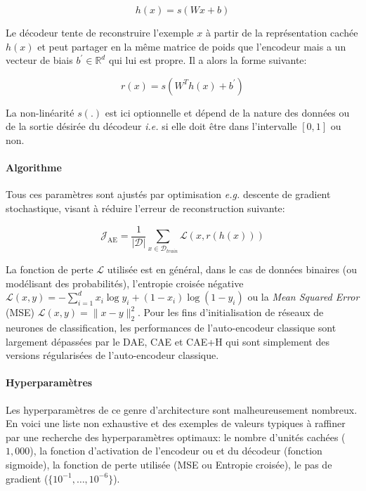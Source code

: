 \begin{equation}
h(x)=s(Wx+b)
\end{equation}

Le décodeur tente de reconstruire l'exemple $x$ à partir de la représentation
cachée $h(x)$ et peut partager en la m\^eme matrice de poids que l'encodeur
mais a un vecteur de biais $b^{'}\in\mathbb{R}^d$ qui lui est propre. Il a
alors la forme suivante:

\begin{equation}
r(x)=s(W^{T} h(x)+b^{'}) \label{eq:autoenc}
\end{equation} 

La non-linéarité $s(.)$ est ici optionnelle et dépend de la nature des données
ou de la sortie désirée du décodeur \textit{i.e.} si elle doit \^etre dans
l'intervalle $[0,1]$ ou non.  \\

\paragraph{Algorithme}
Tous ces paramètres sont ajustés par optimisation \textit{e.g.} descente de
gradient stochastique, visant à réduire l'erreur de reconstruction suivante:

\begin{equation}
\mathcal{J}_{\textrm{AE}} = \frac{1}{\vert \mathcal{D}\vert}\sum_{x\in\mathcal{D}_{train}}\mathcal{L}(x,r(h(x)))
\label{eq:ae}
\end{equation}

La fonction de perte $\mathcal{L}$ utilisée est en général, dans le cas de
données binaires (ou modélisant des probabilités), l'entropie croisée négative
$\mathcal{L}(x,y) = -\sum_{i=1}^d x_i\log y_i + (1-x_i)\log(1-y_i)$ ou la
\textit{Mean Squared Error} (MSE) $\mathcal{L}(x,y) = \| x-y\|^2_2$. Pour les
fins d'initialisation de réseaux de neurones de classification, les
performances de l'auto-encodeur classique sont largement dépassées par le DAE,
CAE et CAE+H qui sont simplement des versions régularisées de l'auto-encodeur
classique.

\paragraph{Hyperparamètres} Les hyperparamètres de ce genre d'architecture sont
malheureusement nombreux. En voici une liste non exhaustive et des exemples de
valeurs typiques à raffiner par une recherche des hyperparamètres optimaux: le
nombre d'unités cachées ($1,000$), la fonction d'activation de l'encodeur ou et
du décodeur (fonction sigmoide), la fonction de perte utilisée (MSE ou Entropie
croisée), le pas de gradient ($\lbrace 10^{-1},\dots,10^{-6}\rbrace$).  \\


